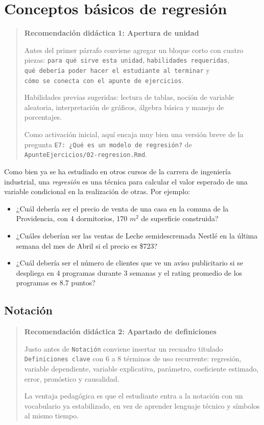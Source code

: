 \documentclass[
]{book}
\providecommand{\tightlist}{%
  \setlength{\itemsep}{0pt}\setlength{\parskip}{0pt}}
\begin{document}
\hypertarget{conceptos-buxe1sicos-de-regresiuxf3n-1}{%
\section{Conceptos básicos de regresión}\label{conceptos-buxe1sicos-de-regresiuxf3n-1}}

\begin{quote}
\textbf{Recomendación didáctica 1: Apertura de unidad}

Antes del primer párrafo conviene agregar un bloque corto con cuatro
piezas: \texttt{para\ qué\ sirve\ esta\ unidad}, \texttt{habilidades\ requeridas},
\texttt{qué\ debería\ poder\ hacer\ el\ estudiante\ al\ terminar} y \texttt{cómo\ se\ conecta\ con\ el\ apunte\ de\ ejercicios}.

Habilidades previas sugeridas: lectura de tablas, noción de variable
aleatoria, interpretación de gráficos, álgebra básica y manejo de
porcentajes.

Como activación inicial, aquí encaja muy bien una versión breve de la
pregunta \texttt{E7:\ ¿Qué\ es\ un\ modelo\ de\ regresión?} de
\texttt{ApunteEjercicios/02-regresion.Rmd}.
\end{quote}

Como bien ya se ha estudiado en otros cursos de la carrera de ingeniería
industrial, una \emph{regresión} es una técnica para calcular el valor
esperado de una variable condicional en la realización de otras. Por
ejemplo:

\begin{itemize}
\tightlist
\item
  ¿Cuál debería ser el precio de venta de una casa en la comuna de la
  Providencia, con 4 dormitorios, 170 \(m^2\) de superficie construida?
\item
  ¿Cuáles deberían ser las ventas de Leche semidescremada Nestlé en la
  última semana del mes de Abril si el precio es \$723?
\item
  ¿Cuál debería ser el número de clientes que ve un aviso publicitario
  si se despliega en 4 programas durante 3 semanas y el rating
  promedio de los programas es 8.7 puntos?
\end{itemize}

\hypertarget{notaciuxf3n-1}{%
\subsection{Notación}\label{notaciuxf3n-1}}

\begin{quote}
\textbf{Recomendación didáctica 2: Apartado de definiciones}

Justo antes de \texttt{Notación} conviene insertar un recuadro titulado
\texttt{Definiciones\ clave} con 6 a 8 términos de uso recurrente:
regresión, variable dependiente, variable explicativa, parámetro,
coeficiente estimado, error, pronóstico y causalidad.

La ventaja pedagógica es que el estudiante entra a la notación con un
vocabulario ya estabilizado, en vez de aprender lenguaje técnico y
símbolos al mismo tiempo.
\end{quote}
\end{document}
